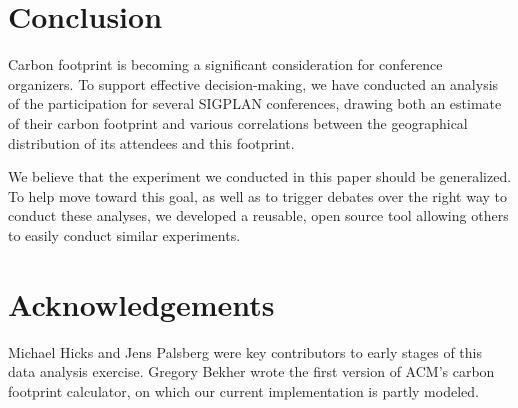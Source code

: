 \section{Conclusion}

Carbon footprint is becoming a significant consideration for conference
organizers. To support effective decision-making, we have conducted an
analysis of the participation for several SIGPLAN conferences, drawing both
an estimate of their carbon footprint and various correlations between the
geographical distribution of its attendees and this footprint.


We believe that the experiment we conducted in this paper should be
generalized.  To help move toward this goal, as well as to trigger debates
over the right way to conduct these analyses, we developed a reusable, open
source tool allowing others to easily conduct similar experiments.

\section*{Acknowledgements}

Michael Hicks and Jens Palsberg were key contributors to early stages of this
data analysis exercise.  Gregory Bekher wrote the first version of ACM's
carbon footprint calculator, on which our current implementation is partly
modeled.

